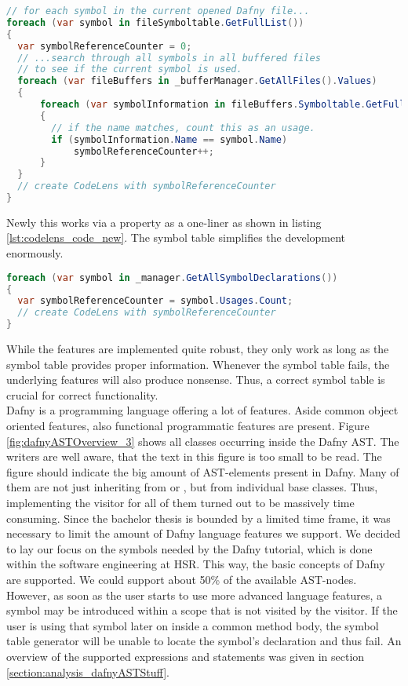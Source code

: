 \begin{lstlisting}[language=csharp, caption={Example for CodeLens in the Prototype}, captionpos=b, label={lst:codelens_code_old}]
// for each symbol in the current opened Dafny file...
foreach (var symbol in fileSymboltable.GetFullList())
{
  var symbolReferenceCounter = 0;
  // ...search through all symbols in all buffered files
  // to see if the current symbol is used.
  foreach (var fileBuffers in _bufferManager.GetAllFiles().Values)
  {
      foreach (var symbolInformation in fileBuffers.Symboltable.GetFullList())
      {
        // if the name matches, count this as an usage.
        if (symbolInformation.Name == symbol.Name)
            symbolReferenceCounter++;
      }
  }
  // create CodeLens with symbolReferenceCounter
}
\end{lstlisting}

Newly this works via a property as a one-liner as shown in listing \ref{lst:codelens_code_new}.
The symbol table simplifies the development enormously.

\begin{lstlisting}[language=csharp, caption={Example for CodeLens With the new Symbol Table}, captionpos=b, label={lst:codelens_code_new}]
foreach (var symbol in _manager.GetAllSymbolDeclarations())
{
  var symbolReferenceCounter = symbol.Usages.Count;
  // create CodeLens with symbolReferenceCounter
}
\end{lstlisting}

While the features are implemented quite robust, they only work as long as the symbol table provides proper information.
Whenever the symbol table fails, the underlying features will also produce nonsense.
Thus, a correct symbol table is crucial for correct functionality.\\

Dafny is a programming language offering a lot of features.
Aside common object oriented features, also functional programmatic features are present.
Figure \ref{fig:dafnyASTOverview_3} shows all classes occurring inside the Dafny AST.
The writers are well aware, that the text in this figure is too small to be read.
The figure should indicate the big amount of AST-elements present in Dafny.
Many of them are not just inheriting from  or , but from individual base classes.
Thus, implementing the visitor for all of them turned out to be massively time consuming.
Since the bachelor thesis is bounded by a limited time frame, it was necessary to limit the amount of Dafny language features we support.
We decided to lay our focus on the symbols needed by the Dafny tutorial, which is done within the software engineering at HSR.
This way, the basic concepts of Dafny are supported.
We could support about 50\% of the available AST-nodes.
However, as soon as the user starts to use more advanced language features, a symbol may be introduced within a scope that is not visited by the visitor.
If the user is using that symbol later on inside a common method body, the symbol table generator will be unable to locate the symbol's declaration and thus fail.
An overview of the supported expressions and statements was given in section \ref{section:analysis_dafnyASTStuff}.\\

